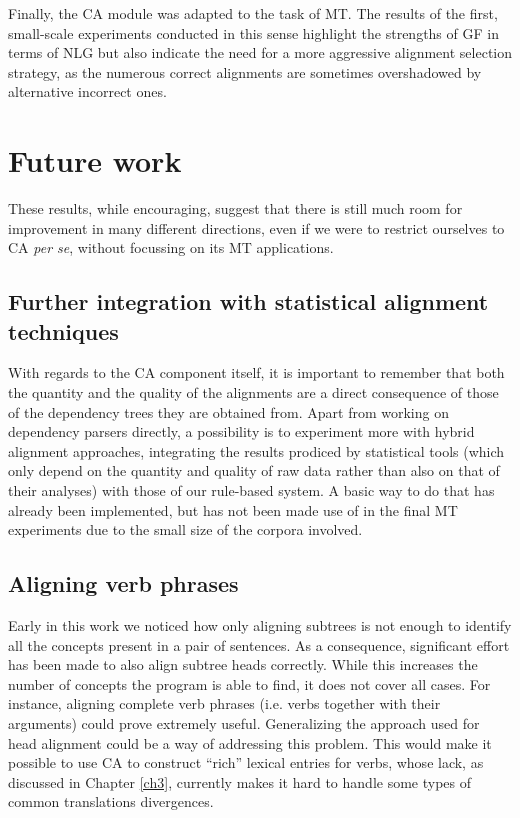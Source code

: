Finally, the CA module was adapted to the task of MT. The results of the first, small-scale experiments conducted in this sense highlight the strengths of GF in terms of NLG but also indicate the need for a more aggressive alignment selection strategy, as the numerous correct alignments are sometimes overshadowed by alternative incorrect ones. 

\section*{Future work} \label{future}
These results, while encouraging, suggest that there is still much room for improvement in many different directions, even if we were to restrict ourselves to CA \textit{per se}, without focussing on its MT applications. 

\subsection*{Further integration with statistical alignment techniques} 
With regards to the CA component itself, it is important to remember that both the quantity and the quality of the alignments are a direct consequence of those of the dependency trees they are obtained from. 
Apart from working on dependency parsers directly, a possibility is to experiment more with hybrid alignment approaches, integrating the results prodiced by statistical tools (which only depend on the quantity and quality of raw data rather than also on that of their analyses) with those of our rule-based system. 
A basic way to do that has already been implemented, but has not been made use of in the final MT experiments due to the small size of the corpora involved.

\subsection*{Aligning verb phrases}
Early in this work we noticed how only aligning subtrees is not enough to identify all the concepts present in a pair of sentences. As a consequence, significant effort has been made to also align subtree heads correctly. While this increases the number of concepts the program is able to find, it does not cover all cases. For instance, aligning complete verb phrases (i.e. verbs together with their arguments) could prove extremely useful. Generalizing the approach used for head alignment could be a way of addressing this problem. 
This would make it possible to use CA to construct ``rich'' lexical entries for verbs, whose lack, as discussed in Chapter \ref{ch3}, currently makes it hard to handle some types of common translations divergences.


